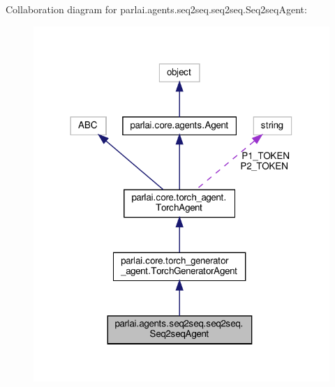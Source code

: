 Collaboration diagram for parlai.\+agents.\+seq2seq.\+seq2seq.\+Seq2seq\+Agent\+:
\nopagebreak
\begin{figure}[H]
\begin{center}
\leavevmode
\includegraphics[width=318pt]{classparlai_1_1agents_1_1seq2seq_1_1seq2seq_1_1Seq2seqAgent__coll__graph}
\end{center}
\end{figure}
